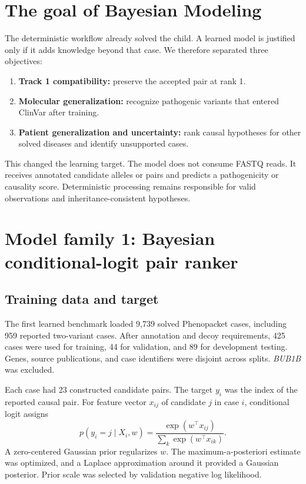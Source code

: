 \documentclass[11pt]{article}
\begin{document}
\section{The goal of Bayesian Modeling}

The deterministic workflow already solved the child. A learned model is justified only if it adds knowledge beyond that case. We therefore separated three objectives:
\begin{enumerate}
\item \textbf{Track 1 compatibility:} preserve the accepted pair at rank 1.
\item \textbf{Molecular generalization:} recognize pathogenic variants that entered ClinVar after training.
\item \textbf{Patient generalization and uncertainty:} rank causal hypotheses for other solved diseases and identify unsupported cases.
\end{enumerate}

This changed the learning target. The model does not consume FASTQ reads. It receives annotated candidate alleles or pairs and predicts a pathogenicity or causality score. Deterministic processing remains responsible for valid observations and inheritance-consistent hypotheses.
\section{Model family 1: Bayesian conditional-logit pair ranker}

\subsection{Training data and target}

The first learned benchmark loaded 9,739 solved Phenopacket cases, including 959 reported two-variant cases. After annotation and decoy requirements, 425 cases were used for training, 44 for validation, and 89 for development testing. Genes, source publications, and case identifiers were disjoint across splits. \textit{BUB1B} was excluded.

Each case had 23 constructed candidate pairs. The target $y_i$ was the index of the reported causal pair. For feature vector $x_{ij}$ of candidate $j$ in case $i$, conditional logit assigns
\begin{equation}
p(y_i=j\mid X_i,w)=\frac{\exp(w^\top x_{ij})}{\sum_k\exp(w^\top x_{ik})}.
\end{equation}
A zero-centered Gaussian prior regularizes $w$. The maximum-a-posteriori estimate was optimized, and a Laplace approximation around it provided a Gaussian posterior. Prior scale was selected by validation negative log likelihood.
\end{document}
